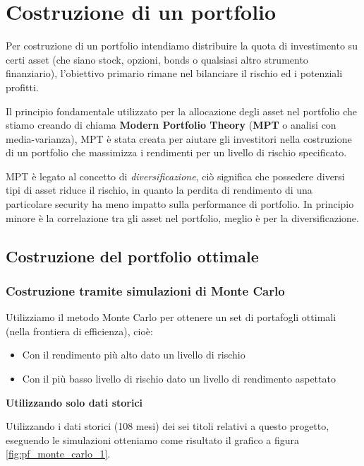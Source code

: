
\section{Costruzione di un portfolio}

Per costruzione di un portfolio intendiamo distribuire la quota di investimento su certi asset (che siano stock, opzioni, bonds o qualsiasi altro strumento finanziario), l'obiettivo primario rimane nel bilanciare il rischio ed i potenziali profitti.

Il principio fondamentale utilizzato per la allocazione degli asset nel portfolio che stiamo creando di chiama \textbf{Modern Portfolio Theory} (\textbf{MPT} o analisi con media-varianza), MPT è stata creata
per aiutare gli investitori nella costruzione di un portfolio che massimizza i rendimenti per un livello di rischio specificato.

MPT è legato al concetto di \emph{diversificazione}, ciò significa che possedere diversi tipi di asset riduce il rischio, in quanto la perdita di rendimento di una particolare security ha meno impatto
sulla performance di portfolio. In principio minore è la correlazione tra gli asset nel portfolio, meglio è per la diversificazione.

\subsection{Costruzione del portfolio ottimale}

\subsubsection{Costruzione tramite simulazioni di Monte Carlo}

Utilizziamo il metodo Monte Carlo per ottenere un set di portafogli ottimali (nella frontiera di efficienza), cioè:
\begin{itemize}
    \item Con il rendimento più alto dato un livello di rischio
    \item Con il più basso livello di rischio dato un livello di rendimento aspettato
\end{itemize}

\textbf{Utilizzando solo dati storici}

Utilizzando i dati storici (108 mesi) dei sei titoli relativi a questo progetto, eseguendo le simulazioni otteniamo come risultato il grafico a figura \ref{fig:pf_monte_carlo_1}.

